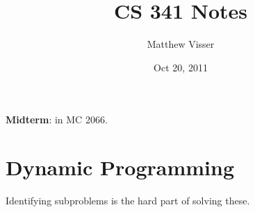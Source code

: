 \documentclass[12pt]{article}
\begin{document}
\title{CS 341 Notes}
\author{Matthew Visser}
\date{Oct 20, 2011}
\maketitle

\textbf{Midterm}: in MC 2066.

\section{Dynamic Programming}

Identifying subproblems is the hard part of solving these.
\end{document}
